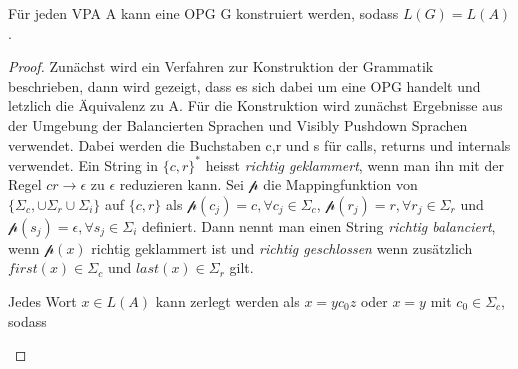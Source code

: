 \begin{lemma}
Für jeden VPA A kann eine OPG G konstruiert werden, sodass $L(G)=L(A)$.
\end{lemma}
\begin{proof}
Zunächst wird ein Verfahren zur Konstruktion der Grammatik beschrieben, dann wird gezeigt, dass es sich dabei um eine OPG handelt und letzlich die Äquivalenz zu A.
Für die Konstruktion wird zunächst Ergebnisse aus der Umgebung der Balancierten Sprachen und Visibly Pushdown Sprachen verwendet. Dabei werden die Buchstaben c,r und s für calls, returns und internals verwendet. Ein String in $\{c, r\}^*$ heisst \textit{richtig geklammert}, wenn man ihn mit der Regel $cr \rightarrow \epsilon$ zu $\epsilon$ reduzieren kann. Sei $\mathcal{p}$ die Mappingfunktion von $\{\Sigma_c, \cup \Sigma_r \cup \Sigma_i\}$ auf $\{c,r\}$ als $\mathcal{p}(c_j)=c, \forall c_j\in \Sigma_c$, $\mathcal{p}(r_j)=r, \forall r_j\in \Sigma_r$ und $\mathcal{p}(s_j)=\epsilon, \forall s_j\in \Sigma_i$ definiert. Dann nennt man einen String \textit{richtig balanciert}, wenn $\mathcal{p}(x)$ richtig geklammert ist und \textit{richtig geschlossen} wenn zusätzlich $first(x) \in \Sigma_c$ und $last(x)\in \Sigma_r$ gilt.
\begin{lemma}
\label{factorize}
Jedes Wort $x\in L(A)$ kann zerlegt werden als $x=yc_0z$ oder $x=y$ mit $c_0\in \Sigma_c$, sodass
\begin{itemize}


\end{itemize}
\end{lemma}
\end{proof}

